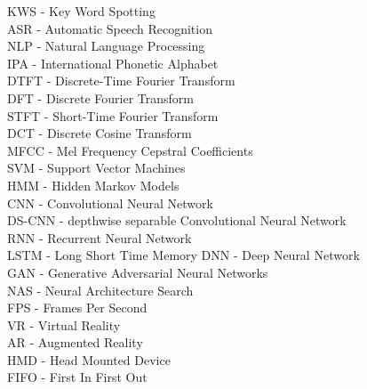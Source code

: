 
KWS - Key Word Spotting\\
ASR - Automatic Speech Recognition\\
NLP - Natural Language Processing\\
IPA - International Phonetic Alphabet\\
%
DTFT - Discrete-Time Fourier Transform\\
DFT - Discrete Fourier Transform\\
STFT - Short-Time Fourier Transform\\
DCT - Discrete Cosine Transform\\
MFCC - Mel Frequency Cepstral Coefficients\\
%
SVM - Support Vector Machines\\
HMM - Hidden Markov Models\\
%
CNN - Convolutional Neural Network\\
DS-CNN - depthwise separable Convolutional Neural Network\\
RNN - Recurrent Neural Network\\
LSTM - Long Short Time Memory
DNN - Deep Neural Network\\
GAN - Generative Adversarial Neural Networks\\
NAS - Neural Architecture Search\\
%
FPS - Frames Per Second\\
VR - Virtual Reality\\
AR - Augmented Reality\\
HMD - Head Mounted Device\\
%
FIFO - First In First Out\\